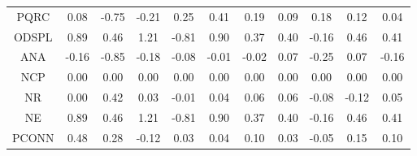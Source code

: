 \begin{longtable}{ | c || c | c | c | c | c | c | c | c | c || c |}
PQRC &  \cellcolor[HTML]{FFFFFF} 0.08 &  \cellcolor[HTML]{FFEFEF} -0.75 &  \cellcolor[HTML]{FFF7F7} -0.21 &  \cellcolor[HTML]{F7F7FF} 0.25 &  \cellcolor[HTML]{F7F7FF} 0.41 &  \cellcolor[HTML]{F7F7FF} 0.19 &  \cellcolor[HTML]{FFFFFF} 0.09 &  \cellcolor[HTML]{F7F7FF} 0.18 &  \cellcolor[HTML]{FFFFFF} 0.12 &  \cellcolor[HTML]{FFFFFF} 0.04 \\
ODSPL &  \cellcolor[HTML]{E7E7FF} 0.89 &  \cellcolor[HTML]{F7F7FF} 0.46 &  \cellcolor[HTML]{DFDFFF} 1.21 &  \cellcolor[HTML]{FFE7E7} -0.81 &  \cellcolor[HTML]{E7E7FF} 0.90 &  \cellcolor[HTML]{F7F7FF} 0.37 &  \cellcolor[HTML]{F7F7FF} 0.40 &  \cellcolor[HTML]{FFF7F7} -0.16 &  \cellcolor[HTML]{F7F7FF} 0.46 &  \cellcolor[HTML]{F7F7FF} 0.41 \\
ANA &  \cellcolor[HTML]{FFF7F7} -0.16 &  \cellcolor[HTML]{FFE7E7} -0.85 &  \cellcolor[HTML]{FFF7F7} -0.18 &  \cellcolor[HTML]{FFFFFF} -0.08 &  \cellcolor[HTML]{FFFFFF} -0.01 &  \cellcolor[HTML]{FFFFFF} -0.02 &  \cellcolor[HTML]{FFFFFF} 0.07 &  \cellcolor[HTML]{FFF7F7} -0.25 &  \cellcolor[HTML]{FFFFFF} 0.07 &  \cellcolor[HTML]{FFFFFF} -0.16 \\
NCP &  \cellcolor[HTML]{FFFFFF} 0.00 &  \cellcolor[HTML]{FFFFFF} 0.00 &  \cellcolor[HTML]{FFFFFF} 0.00 &  \cellcolor[HTML]{FFFFFF} 0.00 &  \cellcolor[HTML]{FFFFFF} 0.00 &  \cellcolor[HTML]{FFFFFF} 0.00 &  \cellcolor[HTML]{FFFFFF} 0.00 &  \cellcolor[HTML]{FFFFFF} 0.00 &  \cellcolor[HTML]{FFFFFF} 0.00 &  \cellcolor[HTML]{FFFFFF} 0.00 \\
NR &  \cellcolor[HTML]{FFFFFF} 0.00 &  \cellcolor[HTML]{F7F7FF} 0.42 &  \cellcolor[HTML]{FFFFFF} 0.03 &  \cellcolor[HTML]{FFFFFF} -0.01 &  \cellcolor[HTML]{FFFFFF} 0.04 &  \cellcolor[HTML]{FFFFFF} 0.06 &  \cellcolor[HTML]{FFFFFF} 0.06 &  \cellcolor[HTML]{FFFFFF} -0.08 &  \cellcolor[HTML]{FFFFFF} -0.12 &  \cellcolor[HTML]{FFFFFF} 0.05 \\
NE &  \cellcolor[HTML]{E7E7FF} 0.89 &  \cellcolor[HTML]{F7F7FF} 0.46 &  \cellcolor[HTML]{DFDFFF} 1.21 &  \cellcolor[HTML]{FFE7E7} -0.81 &  \cellcolor[HTML]{E7E7FF} 0.90 &  \cellcolor[HTML]{F7F7FF} 0.37 &  \cellcolor[HTML]{F7F7FF} 0.40 &  \cellcolor[HTML]{FFF7F7} -0.16 &  \cellcolor[HTML]{F7F7FF} 0.46 &  \cellcolor[HTML]{F7F7FF} 0.41 \\
PCONN &  \cellcolor[HTML]{F7F7FF} 0.48 &  \cellcolor[HTML]{F7F7FF} 0.28 &  \cellcolor[HTML]{FFFFFF} -0.12 &  \cellcolor[HTML]{FFFFFF} 0.03 &  \cellcolor[HTML]{FFFFFF} 0.04 &  \cellcolor[HTML]{FFFFFF} 0.10 &  \cellcolor[HTML]{FFFFFF} 0.03 &  \cellcolor[HTML]{FFFFFF} -0.05 &  \cellcolor[HTML]{FFFFFF} 0.15 &  \cellcolor[HTML]{FFFFFF} 0.10 \\

\end{longtable}
